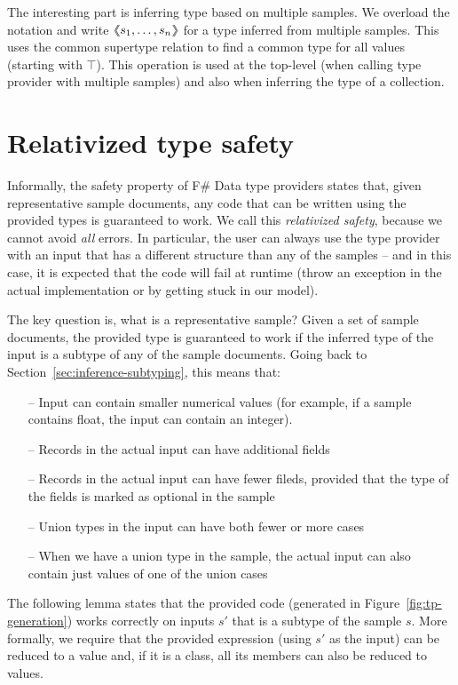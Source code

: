 \documentclass[preprint]{sigplanconf}
\newcommand{\langl}{\begin{picture}(4.5,7)
\put(1.1,2.5){\rotatebox{60}{\line(1,0){5.5}}}
\put(1.1,2.5){\rotatebox{300}{\line(1,0){5.5}}}
\end{picture}}
\newcommand{\rangl}{\begin{picture}(4.5,7)
\put(.9,2.5){\rotatebox{120}{\line(1,0){5.5}}}
\put(.9,2.5){\rotatebox{240}{\line(1,0){5.5}}}
\end{picture}}
\newcommand{\llangl}{\langl\hspace{-0.35em}\langl}
\newcommand{\rrangl}{\rangl\hspace{-0.35em}\rangl}
\newcommand{\semalt}[1]{\llangl #1 \rrangl}
\begin{document}
The interesting part is inferring type based on multiple samples. We overload
the notation and write $\semalt{s_1, \ldots, s_n}$ for a type inferred from multiple samples.
This uses the common supertype relation to find a common type for all values (starting with $\top$).
This operation is used at the top-level (when calling type provider with multiple samples)
and also when inferring the type of a collection.


\section{Relativized type safety}
\label{sec:safety}

Informally, the safety property of F\# Data type providers states that, given representative sample
documents, any code that can be written using the provided types is guaranteed to work. We call this 
\emph{relativized safety}, because we cannot avoid \emph{all} errors. In particular, the user can 
always use the type provider with an input that has a different structure than any of the samples -- and in 
this case, it is expected that the code will fail at runtime (throw an exception in the actual 
implementation or by getting stuck in our model).

The key question is, what is a representative sample? Given a set of sample documents, 
the provided type is guaranteed to work if the inferred type of the input is a subtype of any of the
sample documents. Going back to Section~\ref{sec:inference-subtyping}, this means that:
%
\begin{itemize}[noitemsep]
\item[--] Input can contain smaller numerical values (for example, if a sample contains float, the input can contain an integer).
\item[--] Records in the actual input can have additional fields
\item[--] Records in the actual input can have fewer fileds, provided that the type of the fields is marked as optional in the sample
\item[--] Union types in the input can have both fewer or more cases
\item[--] When we have a union type in the sample, the actual input can also contain just values of one of the union cases
\end{itemize}
%
The following lemma states that the provided code (generated in Figure~\ref{fig:tp-generation})
works correctly on inputs $s'$ that is a subtype of the sample $s$. More formally, we require that the 
provided expression (using $s'$ as the input) can be reduced to a value and, if it is a class,
all its members can also be reduced to values.
\end{document}
